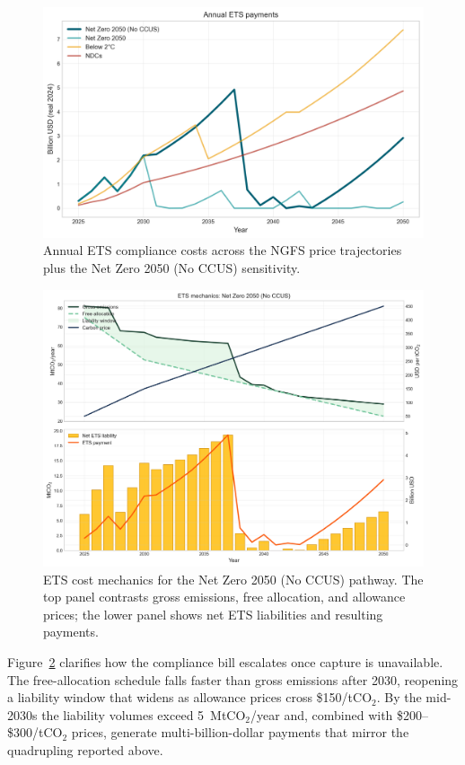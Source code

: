 \documentclass[preprint,1p,authoryear]{elsarticle}
\begin{document}
\begin{figure}[!t]
  \centering
  \includegraphics[width=0.8\linewidth]{ets_cost_by_scenario}
  \caption{Annual ETS compliance costs across the NGFS price trajectories plus the Net Zero 2050 (No CCUS) sensitivity.}
  \label{fig:ets-costs}
\end{figure}

\begin{figure}[!t]
  \centering
  \includegraphics[width=0.85\linewidth]{ets_cost_logic}
  \caption{ETS cost mechanics for the Net Zero 2050 (No CCUS) pathway. The top panel contrasts gross emissions, free allocation, and allowance prices; the lower panel shows net ETS liabilities and resulting payments.}
  \label{fig:ets-logic}
\end{figure}

Figure~\ref{fig:ets-logic} clarifies how the compliance bill escalates once capture is unavailable. The free-allocation schedule falls faster than gross emissions after 2030, reopening a liability window that widens as allowance prices cross \$150/tCO$_2$. By the mid-2030s the liability volumes exceed 5~MtCO$_2$/year and, combined with \$200--\$300/tCO$_2$ prices, generate multi-billion-dollar payments that mirror the quadrupling reported above.
\end{document}
